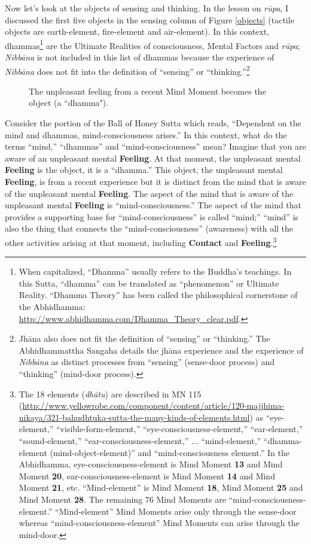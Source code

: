 Now let’s look at the objects of sensing and thinking. In the lesson on \textit{rūpa}, I discussed the first five objects in the sensing column of Figure \ref{objects} (tactile objects are earth-element, fire-element and air-element). In this context, dhammas\footnote{When capitalized, “Dhamma” usually refers to the Buddha’s teachings. In this Sutta, “dhamma” can be translated as “phenomenon” or Ultimate Reality. “Dhamma Theory” has been called the philosophical cornerstone of the Abhidhamma: \url{http://www.abhidhamma.com/Dhamma_Theory_clear.pdf}.} are the Ultimate Realities of consciousness, Mental Factors and \textit{rūpa}; \textit{Nibbāna} is not included in this list of dhammas because the experience of \textit{Nibbāna} does not fit into the definition of “sensing” or “thinking.”\footnote{Jhāna also does not fit the definition of “sensing” or “thinking.” The Abhidhammattha Sangaha details the jhāna experience and the experience of \textit{Nibbāna} as distinct processes from ``sensing” (sense-door process) and “thinking” (mind-door process).}

\begin{figure}[H]
\centering

\caption{The unpleasant feeling from a recent Mind Moment becomes the object (a ``dhamma").}
\label{fig:Feeling}
\end{figure}

Consider the portion of the Ball of Honey Sutta which reads, “Dependent on the mind and dhammas, mind-consciousness arises.” In this context, what do the terms “mind,” “dhammas” and “mind-consciousness” mean? Imagine that you are aware of an unpleasant mental \textbf{Feeling}. At that moment, the unpleasant mental \textbf{Feeling} is the object, it is a “dhamma.” This object, the unpleasant mental \textbf{Feeling}, is from a recent experience but it is distinct from the mind that is aware of the unpleasant mental \textbf{Feeling}. The aspect of the mind that is aware of the unpleasant mental \textbf{Feeling} is “mind-consciousness.” The aspect of the mind that provides a supporting base for “mind-consciousness” is called “mind;” “mind” is also the thing that connects the “mind-consciousness” (awareness) with all the other activities arising at that moment, including \textbf{Contact} and \textbf{Feeling}.\footnote{The 18 elements (\textit{dhātu}) are described in MN 115 (\url{http://www.yellowrobe.com/component/content/article/120-majjhima-nikaya/321-bahudhtuka-sutta-the-many-kinds-of-elements.html}) as “eye-element,” “visible-form-element,” “eye-consciousness-element,” “ear-element,” “sound-element,” “ear-consciousness-element,” ... “mind-element,” “dhamma-element (mind-object-element)” and “mind-consciousness element.” In the Abhidhamma, eye-consciousness-element is Mind Moment \textbf{13} and Mind Moment \textbf{20}, ear-consciousness-element is Mind Moment \textbf{14} and Mind Moment \textbf{21}, etc. “Mind-element” is Mind Moment \textbf{18}, Mind Moment \textbf{25} and Mind Moment \textbf{28}. The remaining 76 Mind Moments are “mind-consciousness-element.” “Mind-element” Mind Moments arise only through the sense-door whereas “mind-consciousness-element” Mind Moments can arise through the mind-door.}

